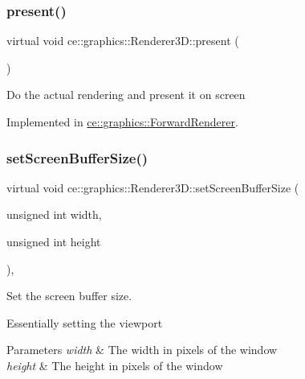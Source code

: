 \subsubsection{\texorpdfstring{present()}{present()}}
{\footnotesize\ttfamily virtual void ce\+::graphics\+::\+Renderer3\+D\+::present (\begin{DoxyParamCaption}{ }\end{DoxyParamCaption})\hspace{0.3cm}{\ttfamily [pure virtual]}}

Do the actual rendering and present it on screen 

Implemented in \hyperlink{classce_1_1graphics_1_1_forward_renderer_a19933a9015f2abbd27b398e7a6d697b6}{ce\+::graphics\+::\+Forward\+Renderer}.

\mbox{\label{classce_1_1graphics_1_1_renderer3_d_a39b5c5b8a62c71600d23de2d642e1546}} 
\subsubsection{\texorpdfstring{set\+Screen\+Buffer\+Size()}{setScreenBufferSize()}}
{\footnotesize\ttfamily virtual void ce\+::graphics\+::\+Renderer3\+D\+::set\+Screen\+Buffer\+Size (\begin{DoxyParamCaption}\item[{unsigned int}]{width,  }\item[{unsigned int}]{height }\end{DoxyParamCaption})\hspace{0.3cm}{\ttfamily [inline]}, {\ttfamily [virtual]}}



Set the screen buffer size. 

Essentially setting the viewport


\begin{DoxyParams}{Parameters}
{\em width} & The width in pixels of the window \\
\hline
{\em height} & The height in pixels of the window \\
\hline
\end{DoxyParams}
\mbox{\label{classce_1_1graphics_1_1_renderer3_d_a67e956930a17600cdcfc689aa624f990}} 
